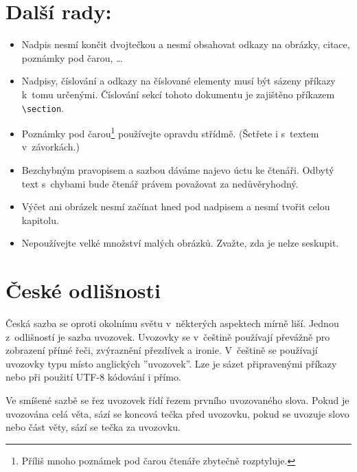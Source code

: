 \documentclass[a4paper, 10pt, twocolumn]{article}
\begin{document}
\section{Další rady:}
\label{Další rady}
\begin{itemize}
    \item 
    Nadpis nesmí končit dvojtečkou a nesmí obsahovat odkazy na obrázky, citace, poznámky pod čarou, \dots

    \item 
    Nadpisy, číslování a odkazy na číslované elementy musí být sázeny příkazy k~tomu určenými.
    Číslování sekcí tohoto dokumentu je zajištěno příkazem \verb|\section|.
    
    \item 
    Poznámky pod čarou\footnote[1]{Příliš mnoho poznámek pod čarou čtenáře zbytečně rozptyluje.} používejte opravdu střídmě.
    (Šetřete i s~textem v~závorkách.)
    
    \item 
    Bezchybným pravopisem a sazbou dáváme najevo úctu ke čtenáři.
    Odbytý text s~chybami bude čtenář právem považovat za nedůvěryhodný.
    
    \item 
    Výčet ani obrázek nesmí začínat hned pod nadpisem a nesmí tvořit celou kapitolu.
    
    \item 
    Nepoužívejte velké množství malých obrázků.
    Zvažte, zda je nelze seskupit.
\end{itemize}


\section{České odlišnosti}
Česká sazba se oproti okolnímu světu v~některých aspektech mírně liší.
Jednou z~odlišností je sazba uvozovek.
Uvozovky se v~češtině používají převážně pro zobrazení přímé řeči, zvýraznění přezdívek a ironie.
V~češtině se používají uvozovky typu  místo anglických ''uvozovek''.
Lze je sázet připravenými příkazy nebo při použití UTF-8 kódování i přímo.

Ve smíšené sazbě se řez uvozovek řídí řezem prvního uvozovaného slova.
Pokud je uvozována celá věta, sází se koncová tečka před uvozovku, pokud se uvozuje slovo nebo část věty, sází se tečka za uvozovku.
\end{document}
